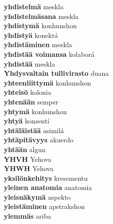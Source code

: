 \textbf{ yhdistelmä  } meskla \\
\textbf{ yhdistelmäsana  } meskla \\
\textbf{ yhdistymä  } konhunshon \\
\textbf{ yhdistyä  } konektá \\
\textbf{ yhdistäminen  } meskla \\
\textbf{ yhdistää voimansa  } kolaborá \\
\textbf{ yhdistää  } meskla \\
\textbf{ Yhdysvaltain tullivirasto  } duana \\
\textbf{ yhteenliittymä  } konhunshon \\
\textbf{ yhteisö  } kolonia \\
\textbf{ yhtenään  } semper \\
\textbf{ yhtymä  } konhunshon \\
\textbf{ yhtyä  } konsentí \\
\textbf{ yhtäläistää  } asimilá \\
\textbf{ yhtäpitävyys  } akuerdo \\
\textbf{ yhtään  } algun \\
\textbf{ YHVH  } Yehova \\
\textbf{ YHWH  } Yehova \\
\textbf{ yksilönkehitys  } kresementu \\
\textbf{ yleinen anatomia  } anatomia \\
\textbf{ yleisnäkymä  } aspekto \\
\textbf{ yleistäminen  } apstrakshon \\
\textbf{ ylemmäs  } ariba \\
